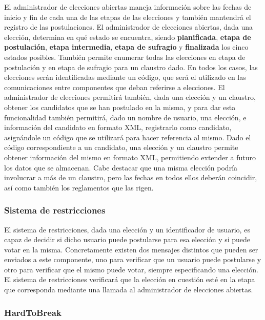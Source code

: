 El administrador de elecciones abiertas maneja información sobre las fechas de inicio y fin de cada una de las etapas de las elecciones y también mantendrá el registro de las postulaciones. 
El administrador de elecciones abiertas, dada una elección, determina en qué estado se encuentra, siendo {\bf planificada}, {\bf etapa de postulación}, {\bf etapa intermedia},  {\bf etapa de sufragio} y {\bf finalizada} los cinco estados posibles. También permite enumerar todas las elecciones en etapa de postulación y en etapa de sufragio para un claustro dado. En todos los casos, las elecciones serán identificadas mediante un código, que será el utilizado en las comunicaciones entre componentes que deban referirse a elecciones.
El administrador de elecciones permitirá también, dada una elección y un claustro, obtener los candidatos que se han postulado en la misma, y para dar esta funcionalidad también permitirá, dado un nombre de usuario, una elección, e información del candidato en formato XML, registrarlo como candidato, asignándole un código que se utilizará para hacer referencia al mismo.
Dado el código correspondiente a un candidato, una elección y un claustro permite obtener información del mismo en formato XML, permitiendo extender a futuro los datos que se almacenan. 
Cabe destacar que una misma elección podría involucrar a más de un claustro, pero las fechas en todos ellos deberán coincidir, así como también los reglamentos que las rigen.

\subsubsection{Sistema de restricciones}

El sistema de restricciones, dada una elección y un identificador de usuario, es capaz de decidir si dicho usuario puede postularse para esa elección y si puede votar en la misma. Concretamente existen dos mensajes distintos que pueden ser enviados a este componente, uno para verificar que un usuario puede postularse y otro para verificar que el mismo puede votar, siempre especificando una elección.
El sistema de restricciones verificará que la elección en cuestión esté en la etapa que corresponda mediante una llamada al administrador de elecciones abiertas.

\subsubsection{HardToBreak}

